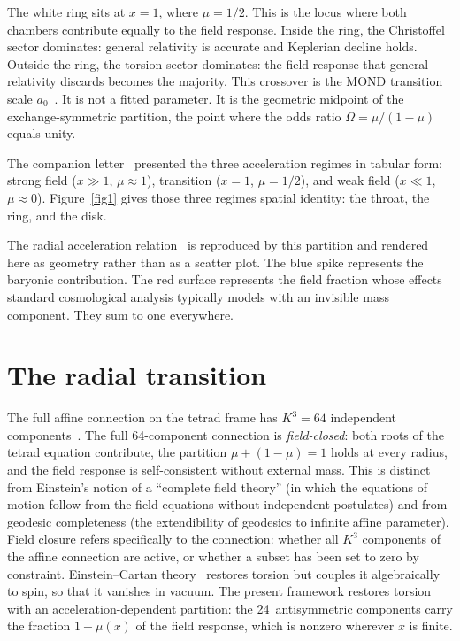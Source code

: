 \documentclass[twocolumn]{iopjournal}
\begin{document}
The white ring sits at $x = 1$, where $\mu = 1/2$.  This is
the locus where both chambers contribute equally to the
field response.  Inside the ring, the Christoffel sector
dominates: general relativity is accurate and Keplerian
decline holds.  Outside the ring, the torsion sector
dominates: the field response that general relativity
discards becomes the majority.  This crossover is the MOND
transition scale $a_0$~\cite{Milgrom1983}.  It is not a
fitted parameter.  It is the geometric midpoint of the
exchange-symmetric partition, the point where the odds ratio
$\Omega = \mu/(1-\mu)$ equals unity.

The companion letter~\cite{Nelson2026b} presented the three
acceleration regimes in tabular form: strong field
($x \gg 1$, $\mu \approx 1$), transition ($x = 1$,
$\mu = 1/2$), and weak field ($x \ll 1$, $\mu \approx 0$).
Figure~\ref{fig1} gives those three regimes spatial identity:
the throat, the ring, and the disk.

The radial acceleration
relation~\cite{McGaugh2016,Li2018} is reproduced by this
partition and rendered here as geometry rather than as a
scatter plot.  The blue
spike represents the baryonic contribution.  The red surface
represents the field fraction whose effects standard
cosmological analysis typically models with an invisible mass
component.  They sum to one everywhere.


\section{The radial transition}

The full affine connection on the tetrad frame has $K^3 = 64$
independent
components~\cite{Nelson2026b,Hehl1976}.  The full
64-component connection is \textit{field-closed}: both roots of the tetrad
equation contribute, the partition $\mu + (1{-}\mu) = 1$ holds
at every radius, and the field response is
self-consistent without external mass.  This is distinct from
Einstein's notion of a ``complete field theory'' (in which the
equations of motion follow from the field equations without
independent postulates) and from geodesic completeness (the
extendibility of geodesics to infinite affine parameter).
Field closure refers specifically to the connection: whether
all $K^3$ components of the affine connection are active, or
whether a subset has been set to zero by constraint.
Einstein--Cartan theory~\cite{Hehl1976} restores torsion but
couples it algebraically to spin, so that it vanishes in
vacuum.  The present framework restores torsion with an
acceleration-dependent partition: the 24~antisymmetric
components carry the fraction $1 - \mu(x)$ of the field
response, which is nonzero wherever $x$ is finite.
\end{document}
